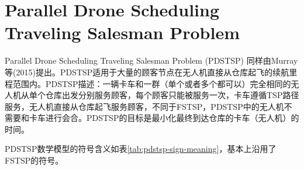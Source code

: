 \section{Parallel Drone Scheduling Traveling Salesman Problem}

Parallel Drone Scheduling Traveling Salesman Problem (PDSTSP) 同样由Murray等(2015)\cite{murrayFlyingSidekickTraveling2015}提出。PDSTSP适用于大量的顾客节点在无人机直接从仓库起飞的续航里程范围内。PDSTSP描述：一辆卡车和一群（单个或者多个都可以）完全相同的无人机从单个仓库出发分别服务顾客，每个顾客只能被服务一次，卡车遵循TSP路径服务，无人机直接从仓库起飞服务顾客，不同于FSTSP，PDSTSP中的无人机不需要和卡车进行会合。PDSTSP的目标是最小化最终到达仓库的卡车（无人机）的时间。

PDSTSP数学模型的符号含义如表\ref{tab:pdstsp-sign-meaning}，基本上沿用了FSTSP的符号。

